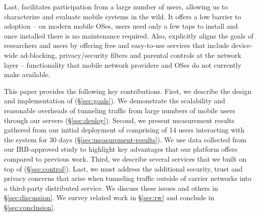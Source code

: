 Last, \meddle facilitates participation from a large number of users, allowing 
us to characterize and evaluate mobile systems in the wild. It offers a low barrier to adoption -- 
on modern mobile OSes, users need only a few taps to install \meddle and 
once installed there is no maintenance required. Also, \meddle explicitly aligns the goals of researchers 
and users by offering free and easy-to-use services that include device-wide
ad-blocking, privacy/security filters and parental controls at the
network layer -- functionality that mobile network providers and OSes do not
currently make available. 

This paper provides the following key contributions. First, we describe the 
design and implementation of \meddle (\S\ref{sec:goals}). We demonstrate the scalability and reasonable overheads of 
tunneling traffic from large numbers of mobile users through our servers (\S\ref{sec:deploy}). 
Second, we present measurement results gathered from our initial deployment of \meddle  
comprising of 14 users interacting with the system for 30 days (\S\ref{sec:measurement-results}). We use data collected from 
our IRB-approved study to highlight key advantages that our platform 
offers compared to previous work. Third, we describe several 
services that we built on top of \meddle (\S\ref{sec:control}). Last, we must address the
additional security, trust and privacy concerns that arise when
tunneling traffic outside of carrier networks into a third-party
distributed service. We discuss these issues and others in
\S\ref{sec:discussion}. We survey related work in \S\ref{sec:rw} and 
conclude in \S\ref{sec:conclusion}.


